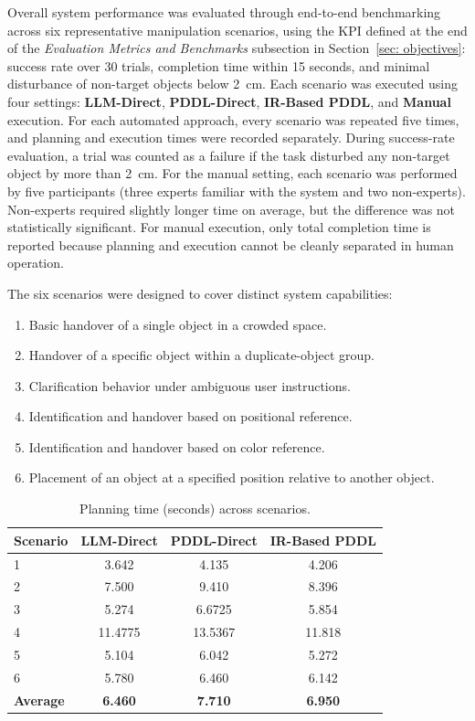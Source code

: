 \documentclass[12pt]{extarticle}
\begin{document}
Overall system performance was evaluated through end-to-end benchmarking across six representative manipulation scenarios, using the KPI defined at the end of the \textit{Evaluation Metrics and Benchmarks} subsection in Section~\ref{sec: objectives}: success rate over 30 trials, completion time within 15 seconds, and minimal disturbance of non-target objects below 2~cm. Each scenario was executed using four settings: \textbf{LLM-Direct}, \textbf{PDDL-Direct}, \textbf{IR-Based PDDL}, and \textbf{Manual} execution. For each automated approach, every scenario was repeated five times, and planning and execution times were recorded separately. During success-rate evaluation, a trial was counted as a failure if the task disturbed any non-target object by more than 2~cm. For the manual setting, each scenario was performed by five participants (three experts familiar with the system and two non-experts). Non-experts required slightly longer time on average, but the difference was not statistically significant. For manual execution, only total completion time is reported because planning and execution cannot be cleanly separated in human operation.

The six scenarios were designed to cover distinct system capabilities:
\begin{enumerate}
    \item Basic handover of a single object in a crowded space.
    \item Handover of a specific object within a duplicate-object group.
    \item Clarification behavior under ambiguous user instructions.
    \item Identification and handover based on positional reference.
    \item Identification and handover based on color reference.
    \item Placement of an object at a specified position relative to another object.
\end{enumerate}

\begin{table}[h]
\centering
\small
\caption{Planning time (seconds) across scenarios.}
\label{tab:overall-planning-time}
\begin{tabular}{lccc}
\toprule
\textbf{Scenario} & \textbf{LLM-Direct} & \textbf{PDDL-Direct} & \textbf{IR-Based PDDL} \\
\midrule
1 & 3.642 & 4.135 & 4.206 \\
2 & 7.500 & 9.410 & 8.396 \\
3 & 5.274 & 6.6725 & 5.854 \\
4 & 11.4775 & 13.5367 & 11.818 \\
5 & 5.104 & 6.042 & 5.272 \\
6 & 5.780 & 6.460 & 6.142 \\
\midrule
\textbf{Average} & \textbf{6.460} & \textbf{7.710} & \textbf{6.950} \\
\bottomrule
\end{tabular}
\end{table}
\end{document}
